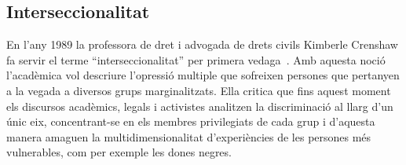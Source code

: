 \begin{comment}
""Aquests nou[sic!] catalans no coneixen Catalunya: la seva tradició, la seva història, el seu art, la seva cultura, la seva literatura, els seus costums, el seu folklore... Tampoc en aquest aspece no coneicen la regió d'on procedeixen. Però jo pregutno: quants catalans hi ha que coneguin tot això que he dit? Del poble, cap. De les classes privilegiades, alguns. Però tot això ja és qüestió de cultura"" (p.17)

""Aquests nou[sic!] catalans parles català, el van aprendre sense adonar-se'n. Molts el parles de manera natural i quotidiana, perquè sí, i altres per afany de sentir-se catalans de debò"" (p.17)

""Parlen un català gruixut, groller i vulgar[...] Desconeixen la gramàtica catalana. No saben llegir en aquest idioma. Escriure'l, encara menys. Però no n'hi ha per a escandaltzar-se'n. Infinitat de catalans d'origen, que s'expressen en català, que parlen en català i que viuen en català, llegiexen en castellà i escriuen les seves cartes en castellà."" (p.18)

""Tota aquesta gent no s'adona de la seva aclimatació. "Són" catalans fins a cert punt. "No" són catalans, també fins a cert punt. No és una qüestió d'honor ni de principis."" (p.19)

"Aquells immigrants murcians no havien arribat a Catalunya com a colonitzadors. Tampoc, o molt febement, com a invasors o peoners. Havien vingut a treballar i a menjar, senzillament, perquè a la seva terra es morien de gana [...] Avui dia, tots s'han integrat, i alguns, ultrapassant o sobrepujant aquesta integració, s'han tornat furibunds catalanistes. [...] Aquesta esperiència pot demostrar o permetre d'esperar que amb els immigrants d'ara passarà el mateixo poc més o menys." (p.32)

"el que passa és que no acabem de decidir-nos a anomenar catalans els qui han nascut aquí de pares de fora" (p.34)

\end{comment}

\subsection{Interseccionalitat}
En l'any 1989 la professora de dret i advogada de drets civils Kimberle Crenshaw fa servir el terme ``interseccionalitat'' per primera vedaga~\autocite{Crenshaw1989}.
Amb aquesta noció l'acadèmica vol descriure l'opressió multiple que sofreixen persones que pertanyen a la vegada a diversos grups marginalitzats.
Ella critica que fins aquest moment els discursos acadèmics, legals i activistes analitzen la discriminació al llarg d'un únic eix,
concentrant-se en els membres privilegiats de cada grup i d'aquesta manera amaguen la multidimensionalitat d'experiències de les persones més vulnerables, com per exemple les dones negres.

